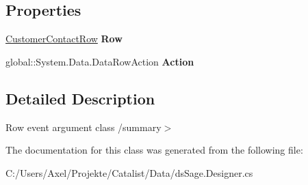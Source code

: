 \subsection*{Properties}
\begin{DoxyCompactItemize}
\item 
\hyperlink{class_products_1_1_data_1_1ds_sage_1_1_customer_contact_row}{Customer\+Contact\+Row} {\bfseries Row}\hypertarget{class_products_1_1_data_1_1ds_sage_1_1_customer_contact_row_change_event_af15727854abf6a90f0a38e2a35d517eb}{}\label{class_products_1_1_data_1_1ds_sage_1_1_customer_contact_row_change_event_af15727854abf6a90f0a38e2a35d517eb}

\item 
global\+::\+System.\+Data.\+Data\+Row\+Action {\bfseries Action}\hypertarget{class_products_1_1_data_1_1ds_sage_1_1_customer_contact_row_change_event_ad9f346ce780f4f7a7563a7f200b54382}{}\label{class_products_1_1_data_1_1ds_sage_1_1_customer_contact_row_change_event_ad9f346ce780f4f7a7563a7f200b54382}

\end{DoxyCompactItemize}


\subsection{Detailed Description}
Row event argument class /summary$>$ 

The documentation for this class was generated from the following file\+:\begin{DoxyCompactItemize}
\item 
C\+:/\+Users/\+Axel/\+Projekte/\+Catalist/\+Data/ds\+Sage.\+Designer.\+cs\end{DoxyCompactItemize}
